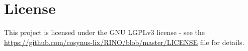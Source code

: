 \documentclass{article}
\begin{document}
\section{License}

This project is licensed under the GNU LGPLv3 license - see the \url{https://github.com/cosynus-lix/RINO/blob/master/LICENSE} file for details.








\end{document}
